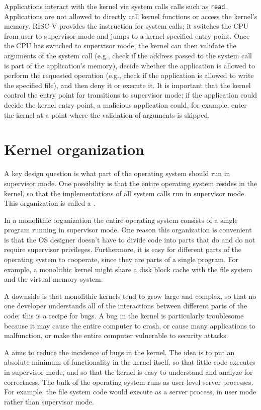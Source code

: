 Applications interact with the kernel via system calls
calls such as {\tt read}.
Applications are not allowed to directly call kernel functions
or access the kernel's memory.
RISC-V provides the  instruction
for system calls; it switches the CPU from user to supervisor mode
and jumps to a kernel-specified entry point.
Once the CPU has switched to supervisor mode,
the kernel can then validate the arguments of the system call (e.g.,
check if the address passed to the system call is part of the application's memory), decide whether
the application is allowed to perform the requested operation (e.g.,
check if the application is allowed to write the specified file), and then deny it
or execute it.  It is important that the kernel control the entry point for
transitions to supervisor mode; if the application could decide the kernel entry
point, a malicious application could, for example, enter the kernel at a point where the
validation of arguments is skipped.

\section{Kernel organization}

A key design question is what part of the operating
system should run in supervisor mode. 
One possibility is that the entire operating system resides
in the kernel, so that the implementations of all system calls
run in supervisor mode.
This organization is called a
.

In a monolithic organization the entire operating system consists of a single
program running in supervisor mode.
One reason this organization is convenient is that the OS designer
doesn't have to divide code into parts that do and do not
require supervisor privileges.
Furthermore, it is easy for different parts of the operating system to
cooperate, since they are parts of a single program.
For example, a monolithic kernel might share a disk block cache 
with the file system and the virtual memory system. 

A downside is that monolithic kernels tend to grow large
and complex, so that no one developer understands all of 
the interactions between different parts of the code;
this is a recipe for bugs. A bug in the kernel is particularly
troublesome because it may cause the entire computer to crash,
or cause many applications to malfunction,
or make the entire computer vulnerable to security attacks.

A  aims to reduce the incidence of bugs in the
kernel. The idea is to put an absolute minimum of functionality in the
kernel itself, so that little code executes in supervisor mode, and so
that the kernel is easy to understand and analyze for correctness. The
bulk of the operating system runs as user-level server processes. For
example, the file system code would execute as a server process, in
user mode rather than supervisor mode.

